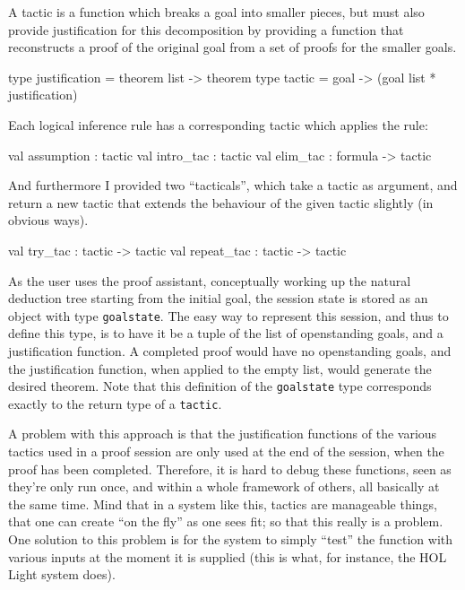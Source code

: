 \documentclass[a4paper,11pt]{article} %
\begin{document}
A tactic is a function which breaks a goal into smaller pieces, but must also provide justification for this decomposition by providing a function that reconstructs a proof of the original goal from a set of proofs for the smaller goals.

\begin{ocamlcode}
  type justification = theorem list -> theorem
  type tactic = goal -> (goal list * justification)
\end{ocamlcode}

Each logical inference rule has a corresponding tactic which applies the rule:

\begin{ocamlcode}
  val assumption : tactic
  val intro_tac : tactic
  val elim_tac : formula -> tactic
\end{ocamlcode}

And furthermore I provided two “tacticals”, which take a tactic as argument, and return a new tactic that extends the behaviour of the given tactic slightly (in obvious ways).

\begin{ocamlcode}
  val try_tac : tactic -> tactic
  val repeat_tac : tactic -> tactic
\end{ocamlcode}

As the user uses the proof assistant, conceptually working up the natural deduction tree starting from the initial goal, the session state is stored as an object with type \texttt{goalstate}. The easy way to represent this session, and thus to define this type, is to have it be a tuple of the list of openstanding goals, and a justification function. A completed proof would have no openstanding goals, and the justification function, when applied to the empty list, would generate the desired theorem. Note that this definition of the \texttt{goalstate} type corresponds exactly to the return type of a \texttt{tactic}.

A problem with this approach is that the justification functions of the various tactics used in a proof session are only used at the end of the session, when the proof has been completed. Therefore, it is hard to debug these functions, seen as they're only run once, and within a whole framework of others, all basically at the same time. Mind that in a system like this, tactics are manageable things, that one can create “on the fly” as one sees fit; so that this really is a problem. One solution to this problem is for the system to simply “test” the function with various inputs at the moment it is supplied (this is what, for instance, the HOL Light system does).
\end{document}
